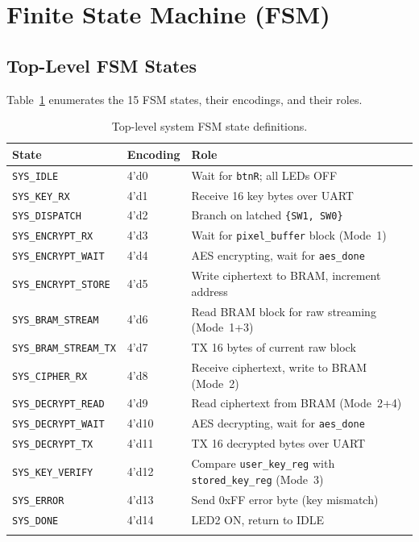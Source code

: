 \documentclass[12pt,a4paper]{article}
\begin{document}
\section{Finite State Machine (FSM)}

\subsection{Top-Level FSM States}

Table~\ref{tab:states} enumerates the 15 FSM states, their encodings, and their roles.

\begin{longtable}{@{}lll@{}}
\toprule
\textbf{State} & \textbf{Encoding} & \textbf{Role} \\
\midrule
\endhead
\texttt{SYS\_IDLE}            & 4'd0  & Wait for \texttt{btnR}; all LEDs OFF \\
\texttt{SYS\_KEY\_RX}         & 4'd1  & Receive 16 key bytes over UART \\
\texttt{SYS\_DISPATCH}        & 4'd2  & Branch on latched \texttt{\{SW1, SW0\}} \\
\texttt{SYS\_ENCRYPT\_RX}     & 4'd3  & Wait for \texttt{pixel\_buffer} block (Mode~1) \\
\texttt{SYS\_ENCRYPT\_WAIT}   & 4'd4  & AES encrypting, wait for \texttt{aes\_done} \\
\texttt{SYS\_ENCRYPT\_STORE}  & 4'd5  & Write ciphertext to BRAM, increment address \\
\texttt{SYS\_BRAM\_STREAM}    & 4'd6  & Read BRAM block for raw streaming (Mode~1+3) \\
\texttt{SYS\_BRAM\_STREAM\_TX}& 4'd7  & TX 16 bytes of current raw block \\
\texttt{SYS\_CIPHER\_RX}      & 4'd8  & Receive ciphertext, write to BRAM (Mode~2) \\
\texttt{SYS\_DECRYPT\_READ}   & 4'd9  & Read ciphertext from BRAM (Mode~2+4) \\
\texttt{SYS\_DECRYPT\_WAIT}   & 4'd10 & AES decrypting, wait for \texttt{aes\_done} \\
\texttt{SYS\_DECRYPT\_TX}     & 4'd11 & TX 16 decrypted bytes over UART \\
\texttt{SYS\_KEY\_VERIFY}     & 4'd12 & Compare \texttt{user\_key\_reg} with \texttt{stored\_key\_reg} (Mode~3) \\
\texttt{SYS\_ERROR}           & 4'd13 & Send 0xFF error byte (key mismatch) \\
\texttt{SYS\_DONE}            & 4'd14 & LED2 ON, return to IDLE \\
\bottomrule
\caption{Top-level system FSM state definitions.}
\label{tab:states}
\end{longtable}
\end{document}
